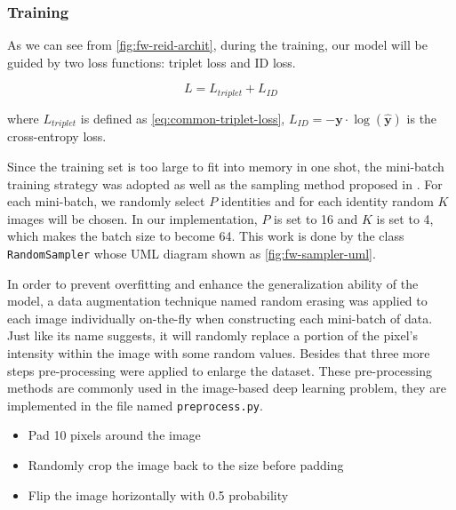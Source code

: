 \subsubsection{Training}
\label{fw-recognizer-spec-train}

As we can see from \autoref{fig:fw-reid-archit}, during the training, our model
will be guided by two loss functions: triplet loss and ID loss.


\begin{equation}
L = L_{triplet} + L_{ID}
\end{equation}

\noindent where $L_{triplet}$ is defined as \autoref{eq:common-triplet-loss},
$L_{ID} = - \mathbf{y} \cdot \log(\mathbf{\hat{y}})$
is the cross-entropy loss.

Since the training set is too large to fit into memory in one shot,
the mini-batch training strategy was adopted as well as
the sampling method proposed in \cite{in-defense-of-triplet-loss-for-reid-2017}.
For each mini-batch, we randomly select $P$ identities and for each identity 
random $K$ images will be chosen. In our implementation,
$P$ is set to 16 and $K$ is set to 4, which makes the batch size to become 64.
This work is done by the class \texttt{RandomSampler} whose UML diagram shown as
\autoref{fig:fw-sampler-uml}.

In order to prevent overfitting and enhance the generalization ability of the
model, a data augmentation technique named random erasing
\cite{random-erasing-data-augmentation-2017} was applied to each image
individually on-the-fly when constructing each mini-batch of data. Just like its
name suggests, it will randomly replace a portion of the pixel's intensity 
within the image with some random values. 
Besides that three more steps pre-processing
were applied to enlarge the dataset. These pre-processing methods are commonly
used in the image-based deep learning problem, they are implemented in the file
named \texttt{preprocess.py}.

\begin{itemize}
    \item Pad 10 pixels around the image
    \item Randomly crop the image back to the size before padding
    \item Flip the image horizontally with 0.5 probability
\end{itemize}

